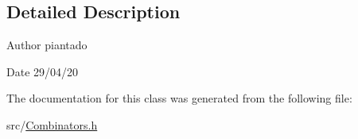 \subsection{Detailed Description}
\begin{DoxyAuthor}{Author}
piantado 
\end{DoxyAuthor}
\begin{DoxyDate}{Date}
29/04/20 
\end{DoxyDate}


The documentation for this class was generated from the following file\+:\begin{DoxyCompactItemize}
\item 
src/\hyperlink{_combinators_8h}{Combinators.\+h}\end{DoxyCompactItemize}
